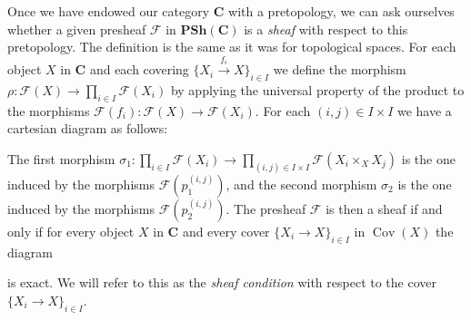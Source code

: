 \documentclass[12pt,a4paper]{amsart}
\theoremstyle{plain}
\theoremstyle{definition}
\theoremstyle{remark}
\begin{document}
Once we have endowed our category $\mathbf{C}$ with a pretopology, we can ask ourselves whether a given presheaf $\mathscr{F}$ in $\mathbf{PSh}(\mathbf{C})$ is a \textit{sheaf} with respect to this pretopology.
The definition is the same as it was for topological spaces.
For each object $X$ in $\mathbf{C}$ and each covering $\{ X_{i} \xrightarrow{f_{i}} X \}_{i \in I}$ we define the morphism $\rho \colon \mathscr{F}(X) \to \prod_{i \in I} \mathscr{F}(X_{i})$ by applying the universal property of the product to the morphisms $\mathscr{F}(f_{i}) \colon \mathscr{F}(X) \to \mathscr{F}(X_{i})$.
For each $(i, j) \in I \times I$ we have a cartesian diagram as follows:
\begin{center}
\end{center}
The first morphism $\sigma_{1} \colon \prod_{i \in I} \mathscr{F}(X_{i}) \to \prod_{(i, j) \in I \times I} \mathscr{F}(X_{i} \times_{X} X_{j})$ is the one induced by the morphisms $\mathscr{F}(p_{1}^{(i,j)})$, and the second morphism $\sigma_{2}$ is the one induced by the morphisms $\mathscr{F}(p_{2}^{(i,j)})$.
The presheaf $\mathscr{F}$ is then a sheaf if and only if for every object $X$ in $\mathbf{C}$ and every cover $\{ X_{i} \to X \}_{i \in I}$ in $\operatorname{Cov}(X)$ the diagram
\begin{center}
\end{center}
is exact.
We will refer to this as the \textit{sheaf condition} with respect to the cover $\{ X_{i} \to X \}_{i \in I}$.
\end{document}
